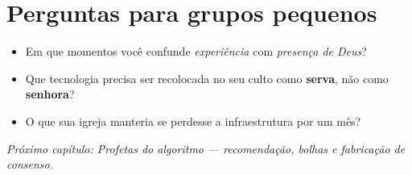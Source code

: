 \section{Perguntas para grupos pequenos}
\begin{itemize}[leftmargin=*,noitemsep]
  \item Em que momentos você confunde \textit{experiência} com \textit{presença de Deus}?
  \item Que tecnologia precisa ser recolocada no seu culto como \textbf{serva}, não como \textbf{senhora}?
  \item O que sua igreja manteria se perdesse a infraestrutura por um mês?
\end{itemize}

\bigskip
\noindent\textit{Próximo capítulo: Profetas do algoritmo --- recomendação, bolhas e fabricação de consenso.}
